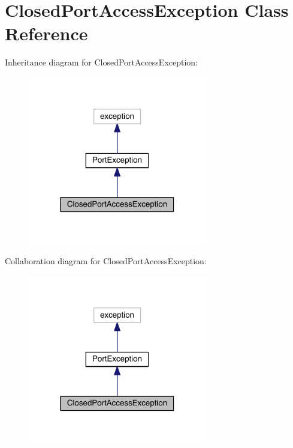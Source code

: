 \hypertarget{class_closed_port_access_exception}{}\section{Closed\+Port\+Access\+Exception Class Reference}
\label{class_closed_port_access_exception}


Inheritance diagram for Closed\+Port\+Access\+Exception\+:
\nopagebreak
\begin{figure}[H]
\begin{center}
\leavevmode
\includegraphics[width=222pt]{class_closed_port_access_exception__inherit__graph}
\end{center}
\end{figure}


Collaboration diagram for Closed\+Port\+Access\+Exception\+:
\nopagebreak
\begin{figure}[H]
\begin{center}
\leavevmode
\includegraphics[width=222pt]{class_closed_port_access_exception__coll__graph}
\end{center}
\end{figure}
